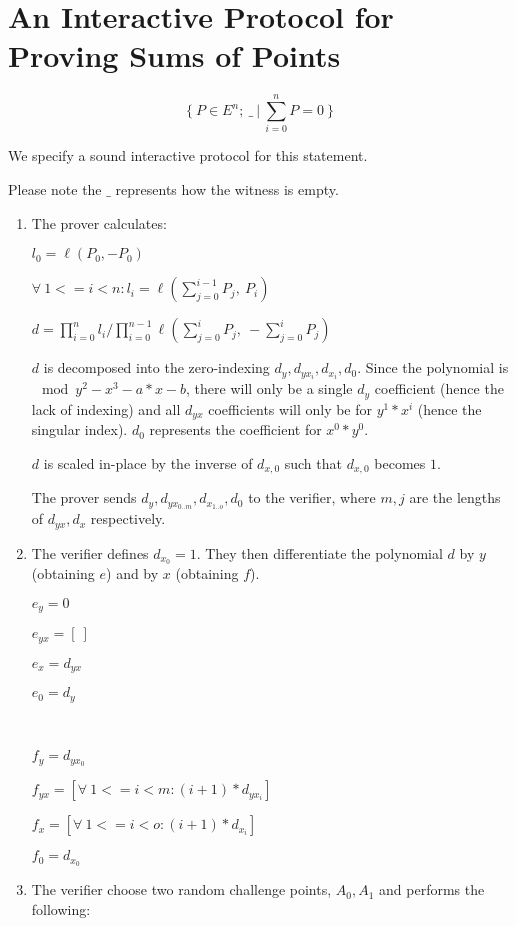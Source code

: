 \documentclass[]{article}
\begin{document}
	\newpage

	\section{An Interactive Protocol for Proving Sums of Points}
	
	$$\{~ P \in E^n;~ \_ ~|~ \sum^n_{i=0} P = 0 ~\}$$
	
	We specify a sound interactive protocol for this statement.
	
	Please note the $\_$ represents how the witness is empty.
	
	\begin{enumerate}
		\item
		The prover calculates:
		
		$l_0 = \ell(P_0, -P_0)$

		$\forall~ 1 <= i < n: l_i = \ell(\sum^{i-1}_{j=0} P_j,~ P_i)$
		
		$d = \prod^n_{i=0} l_i / \prod^{n-1}_{i=0} \ell(\sum^i_{j=0} P_j,~ -\sum^i_{j=0} P_j)$
		
		$d$ is decomposed into the zero-indexing $d_y, d_{yx_i}, d_{x_i}, d_0$. Since the polynomial is $\mod y^2 - x^3 - a * x - b$, there will only be a single $d_y$ coefficient (hence the lack of indexing) and all $d_{yx}$ coefficients will only be for $y^1 * x^i$ (hence the singular index). $d_0$ represents the coefficient for $x^0 * y^0$.
		
		$d$ is scaled in-place by the inverse of $d_{x,0}$ such that $d_{x,0}$ becomes $1$.

		The prover sends $d_y, d_{yx_{0..m}}, d_{x_{1..o}}, d_0$ to the verifier, where $m, j$ are the lengths of $d_{yx}, d_x$ respectively.
		
		\item The verifier defines $d_{x_0} = 1$. They then differentiate the polynomial $d$ by $y$ (obtaining $e$) and by $x$ (obtaining $f$).
		
		$e_y = 0$
		
		$e_{yx} = [~]$
		
		$e_x = d_{yx}$
		
		$e_0 = d_y$
		
		\
		
		$f_y = d_{yx_0}$
		
		$f_{yx} = [ \forall~ 1 <= i < m: (i + 1) * d_{yx_i}]$
		
		$f_x = [ \forall~ 1 <= i < o: (i + 1) * d_{x_i}]$
		
		$f_0 = d_{x_0}$
		
		\item The verifier choose two random challenge points, $A_0, A_1$ and performs the following:
		

\end{enumerate}
\end{document}
